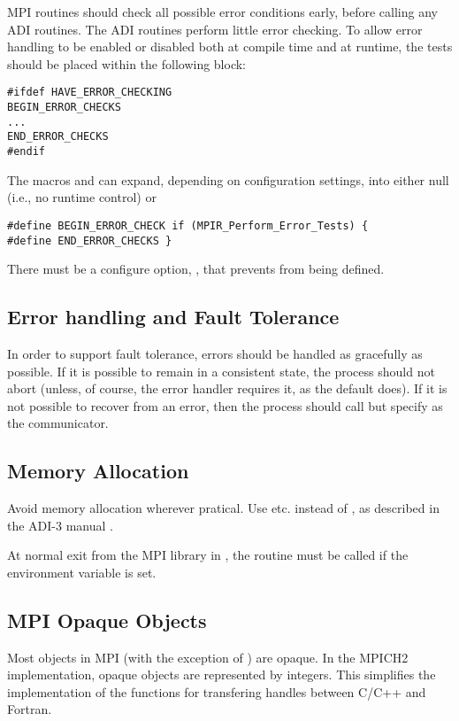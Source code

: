 \documentclass{article}
\begin{document}
MPI routines should check all possible error conditions early, before
calling any ADI routines.  The ADI routines perform little error
checking.  To allow error handling to be enabled or disabled both at compile
time 
and at runtime, the tests should be placed within the following block:
\begin{verbatim}
#ifdef HAVE_ERROR_CHECKING
BEGIN_ERROR_CHECKS
...
END_ERROR_CHECKS
#endif
\end{verbatim}
The macros  and  can
expand, depending on configuration settings, into either null (i.e.,
no runtime control) or 
\begin{verbatim}
#define BEGIN_ERROR_CHECK if (MPIR_Perform_Error_Tests) {
#define END_ERROR_CHECKS }
\end{verbatim}

There must be a configure option, ,
that prevents  from being defined.

\subsection{Error handling and Fault Tolerance}
In order to support fault tolerance, errors should be handled as
gracefully as possible.  If it is possible to remain in a consistent
state, the process should not abort (unless, of course, the error
handler requires it, as the default  does).  
If it is not possible to recover from an error, then the process
should call  but specify  as the
communicator.  

\subsection{Memory Allocation}
Avoid memory allocation wherever pratical.  Use 
etc. instead of , as described in the ADI-3 manual
\cite{adi3man}. 

At normal exit from the MPI library in , the
routine  must be called if the environment variable
 is set.  

\subsection{MPI Opaque Objects}

Most objects in MPI (with the exception of ) are
opaque.  In the MPICH2 implementation, opaque objects are represented
by integers.  This simplifies the implementation of the functions for
transfering handles between C/C++ and Fortran.  
\end{document}

